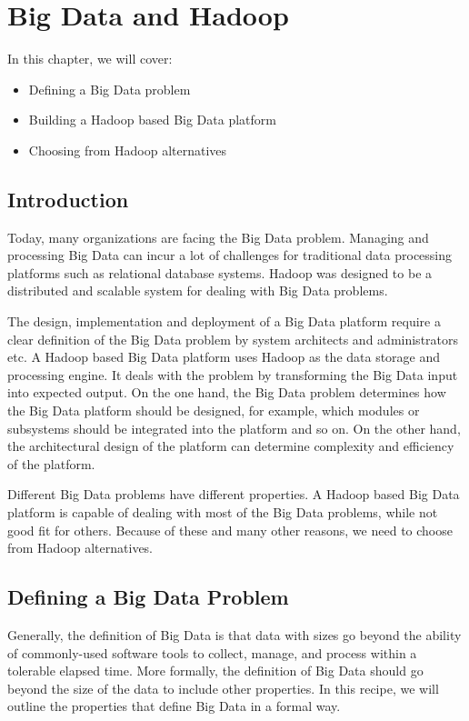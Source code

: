 \chapter{Big Data and Hadoop}\label{chap:1}
In this chapter, we will cover:
\begin{itemize}
  \item Defining a Big Data problem
  \item Building a Hadoop based Big Data platform
  \item Choosing from Hadoop alternatives
\end{itemize}

\section{Introduction}\label{chap1:intro}
Today, many organizations are facing the Big Data problem. Managing and processing Big Data can incur a lot of challenges for traditional data processing platforms such as relational database systems. Hadoop was designed to be a distributed and scalable system for dealing with Big Data problems.

The design, implementation and deployment of a Big Data platform require a clear definition of the Big Data problem by system architects and administrators etc. A Hadoop based Big Data platform uses Hadoop as the data storage and processing engine. It deals with the problem by transforming the Big Data input into expected output. On the one hand, the Big Data problem determines how the Big Data platform should be designed, for example, which modules or subsystems should be integrated into the platform and so on. On the other hand, the architectural design of the platform can determine complexity and efficiency of the platform.

Different Big Data problems have different properties. A Hadoop based Big Data platform is capable of dealing with most of the Big Data problems, while not good fit for others. Because of these and many other reasons, we need to choose from Hadoop alternatives.

\section{Defining a Big Data Problem}\label{chap1:problem}
Generally, the definition of Big Data is that data with sizes go beyond the ability of commonly-used software tools to collect, manage, and process within a tolerable elapsed time. More formally, the definition of Big Data should go beyond the size of the data to include other properties. In this recipe, we will outline the properties that define Big Data in a formal way.

